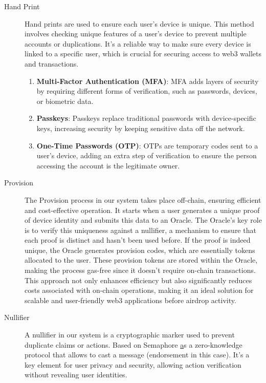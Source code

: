 \documentclass[12pt,oneside]{article}
\begin{document}
\begin{description}
  \item[Hand Print] 
  Hand prints are used to ensure each user's device is unique. This method involves checking unique features of a user's device to prevent multiple accounts or duplications. It's a reliable way to make sure every device is linked to a specific user, which is crucial for securing access to web3 wallets and transactions. 
  
  \begin{enumerate}
      \item \textbf{Multi-Factor Authentication (MFA)}: MFA adds layers of security by requiring different forms of verification, such as passwords, devices, or biometric data.
      \item \textbf{Passkeys}: Passkeys replace traditional passwords with device-specific keys, increasing security by keeping sensitive data off the network.
      \item \textbf{One-Time Passwords (OTP)}: OTPs are temporary codes sent to a user's device, adding an extra step of verification to ensure the person accessing the account is the legitimate owner.
  \end{enumerate}  

  \item[Provision]
  The Provision process in our system takes place off-chain, ensuring
  efficient and cost-effective operation. It starts when a user generates a unique proof of
  device identity and submits this data to an Oracle. The Oracle's key role is to verify this uniqueness 
  against a nullifier, a mechanism to ensure that each proof is distinct and hasn't been used before. 
  If the proof is indeed unique, the Oracle generates provision codes, which are essentially tokens allocated 
  to the user. These provision tokens are stored within the Oracle, making the process gas-free since it doesn't require
  on-chain transactions. This approach not only enhances efficiency but also significantly reduces costs associated with
  on-chain operations, making it an ideal solution for scalable and user-friendly web3 applications before airdrop activity.

  \item[Nullifier]
  A nullifier in our system is a cryptographic marker used to prevent duplicate claims or actions. 
  Based on Semaphore \href{https://semaphore.pse.dev/} as a zero-knowledge protocol that allows to cast a message (endorsement in this case).
  It's a key element for user privacy and security, allowing action verification without revealing 
  user identities. \cite{semaphore_pse_dev}


\end{description}
\end{document}
